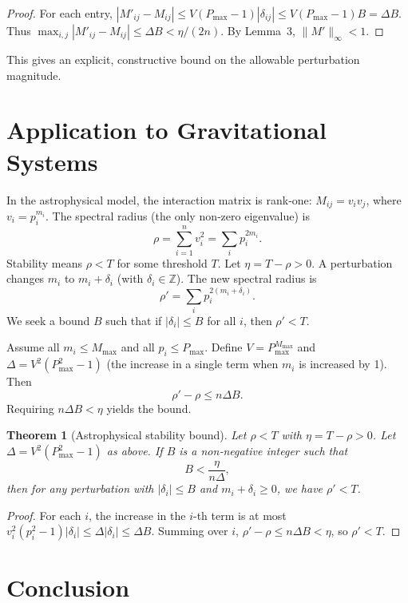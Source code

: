 \documentclass[12pt,a4paper]{article}
\newtheorem{theorem}{Theorem}
\begin{document}
\begin{proof}
For each entry, $|M'_{ij} - M_{ij}| \le V (P_{\max}-1) |\delta_{ij}| \le V (P_{\max}-1) B = \Delta B$. Thus $\max_{i,j} |M'_{ij} - M_{ij}| \le \Delta B < \eta/(2n)$. By Lemma~3, $\|M'\|_\infty < 1$.
\end{proof}

This gives an explicit, constructive bound on the allowable perturbation magnitude.

\section{Application to Gravitational Systems}

In the astrophysical model, the interaction matrix is rank‐one: $M_{ij} = v_i v_j$, where $v_i = p_i^{m_i}$. The spectral radius (the only non‐zero eigenvalue) is
\[
\rho = \sum_{i=1}^n v_i^2 = \sum_i p_i^{2m_i}.
\]
Stability means $\rho < T$ for some threshold $T$. Let $\eta = T - \rho > 0$. A perturbation changes $m_i$ to $m_i + \delta_i$ (with $\delta_i \in \mathbb{Z}$). The new spectral radius is
\[
\rho' = \sum_i p_i^{2(m_i + \delta_i)}.
\]
We seek a bound $B$ such that if $|\delta_i| \le B$ for all $i$, then $\rho' < T$.

Assume all $m_i \le M_{\max}$ and all $p_i \le P_{\max}$. Define $V = P_{\max}^{M_{\max}}$ and $\Delta = V^2 (P_{\max}^2 - 1)$ (the increase in a single term when $m_i$ is increased by 1). Then
\[
\rho' - \rho \le n \Delta B.
\]
Requiring $n \Delta B < \eta$ yields the bound.

\begin{theorem}[Astrophysical stability bound]
Let $\rho < T$ with $\eta = T - \rho > 0$. Let $\Delta = V^2 (P_{\max}^2 - 1)$ as above. If $B$ is a non‐negative integer such that
\[
B < \frac{\eta}{n \Delta},
\]
then for any perturbation with $|\delta_i| \le B$ and $m_i + \delta_i \ge 0$, we have $\rho' < T$.
\end{theorem}

\begin{proof}
For each $i$, the increase in the $i$-th term is at most $v_i^2 (p_i^2 - 1) |\delta_i| \le \Delta |\delta_i| \le \Delta B$. Summing over $i$, $\rho' - \rho \le n \Delta B < \eta$, so $\rho' < T$.
\end{proof}

\section{Conclusion}
\end{document}

